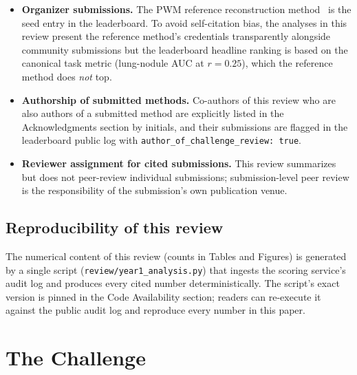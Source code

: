\documentclass[twoside,11pt]{article}
\begin{document}
\begin{itemize}
    \item \textbf{Organizer submissions.} The PWM reference reconstruction method~\citep{ws3reference} is the seed entry in the leaderboard. To avoid self-citation bias, the analyses in this review present the reference method's credentials transparently alongside community submissions but the leaderboard headline ranking is based on the canonical task metric (lung-nodule AUC at $r = 0.25$), which the reference method does \emph{not} top.
    \item \textbf{Authorship of submitted methods.} Co-authors of this review who are also authors of a submitted method are explicitly listed in the Acknowledgments section by initials, and their submissions are flagged in the leaderboard public log with \texttt{author\_of\_challenge\_review: true}.
    \item \textbf{Reviewer assignment for cited submissions.} This review summarizes but does not peer-review individual submissions; submission-level peer review is the responsibility of the submission's own publication venue.
\end{itemize}

\subsection{Reproducibility of this review}

The numerical content of this review (counts in Tables and Figures) is generated by a single script (\texttt{review/year1\_analysis.py}) that ingests the scoring service's audit log and produces every cited number deterministically. The script's exact version is pinned in the Code Availability section; readers can re-execute it against the public audit log and reproduce every number in this paper.

\section{The Challenge}
\label{sec:challenge}
\end{document}
